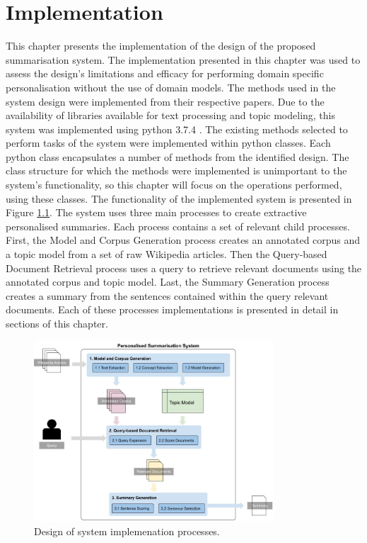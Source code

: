 \chapter{Implementation}
\label{chp:4}
This chapter presents the implementation of the design of the proposed summarisation system. The implementation presented in this chapter was used to assess the design’s limitations and efficacy for performing domain specific personalisation without the use of domain models. The methods used in the system design were implemented from their respective papers. Due to the availability of libraries available for text processing and topic modeling, this system was implemented using python 3.7.4 \citep{van2009python}. The existing methods selected to perform tasks of the system were implemented within python classes. Each python class encapsulates a number of methods from the identified design. The class structure for which the methods were implemented is unimportant to the system’s functionality, so this chapter will focus on the operations performed, using these classes. The functionality of the implemented system is presented in Figure \ref{designI}. The system uses three main processes to create extractive personalised summaries. Each process contains a set of relevant child processes. First, the Model and Corpus Generation process creates an annotated corpus and a topic model from a set of raw Wikipedia articles. Then the Query-based Document Retrieval process uses a query to retrieve relevant documents using the annotated corpus and topic model. Last, the Summary Generation process creates a summary from the sentences contained within the query relevant documents. Each of these processes implementations is presented in detail in sections of this chapter. 

\begin{figure}[H]
    \centering
         \includegraphics[width=0.80\textwidth]{Figures/System_Design_Overview.jpg}
          \caption{Design of system implemenation processes.}
           \label{designI}
\end{figure}

